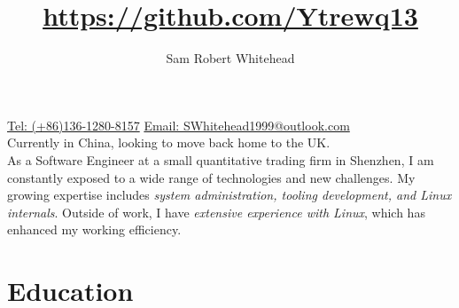 



\title{\url{https://github.com/Ytrewq13}}
\author{Sam Robert Whitehead}

\maketitle

\pagestyle{empty}
\thispagestyle{empty}

\href{tel:(+86)13612808157}{Tel: (+86)136-1280-8157} \hfill
\href{mailto:SWhitehead1999@outlook.com}{Email: SWhitehead1999@outlook.com}
\\
Currently in China, looking to move back home to the UK.
\\
As a Software Engineer at a small quantitative trading firm in Shenzhen, I
am constantly exposed to a wide range of technologies and new challenges. My
growing expertise includes \emph{system administration, tooling development,
and Linux internals}. Outside of work, I have \emph{extensive experience with
Linux}, which has enhanced my working efficiency.

\section{Education}
